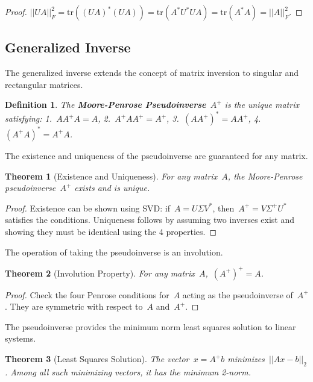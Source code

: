\documentclass[12pt]{article}
\newtheorem{theorem}{Theorem}[section]
\newtheorem{definition}{Definition}[section]
\begin{document}
\begin{proof}
    $||UA||_F^2 = \text{tr}((UA)^* (UA)) = \text{tr}(A^* U^* U A) = \text{tr}(A^* A) = ||A||_F^2$.
\end{proof}

\subsection{Generalized Inverse}

The generalized inverse extends the concept of matrix inversion to singular and rectangular matrices.

\begin{definition}
    The \textbf{Moore-Penrose Pseudoinverse}~$A^+$ is the unique matrix satisfying: 1.~$A A^+ A = A$, 2.~$A^+ A A^+ = A^+$, 3.~$(A A^+)^* = A A^+$, 4.~$(A^+ A)^* = A^+ A$.
\end{definition}

The existence and uniqueness of the pseudoinverse are guaranteed for any matrix.

\begin{theorem}[Existence and Uniqueness]
    For any matrix~$A$, the Moore-Penrose pseudoinverse~$A^+$ exists and is unique.
\end{theorem}

\begin{proof}
    Existence can be shown using SVD: if~$A = U \Sigma V^*$, then~$A^+ = V \Sigma^+ U^*$ satisfies the conditions. Uniqueness follows by assuming two inverses exist and showing they must be identical using the 4 properties.
\end{proof}

The operation of taking the pseudoinverse is an involution.

\begin{theorem}[Involution Property]
    For any matrix~$A$,~$(A^+)^+ = A$.
\end{theorem}

\begin{proof}
    Check the four Penrose conditions for~$A$ acting as the pseudoinverse of~$A^+$. They are symmetric with respect to~$A$ and~$A^+$.
\end{proof}

The pseudoinverse provides the minimum norm least squares solution to linear systems.

\begin{theorem}[Least Squares Solution]
    The vector~$x = A^+ b$ minimizes~$||Ax - b||_2$. Among all such minimizing vectors, it has the minimum 2-norm.
\end{theorem}
\end{document}
